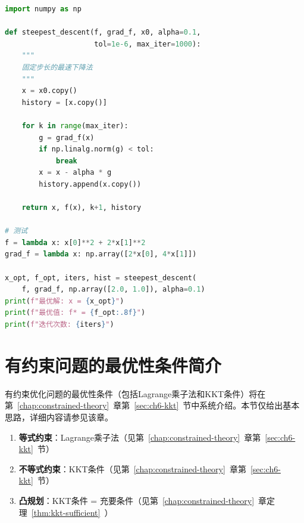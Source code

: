 \begin{lstlisting}[language=Python, caption=最速下降法实现]
import numpy as np

def steepest_descent(f, grad_f, x0, alpha=0.1, 
                     tol=1e-6, max_iter=1000):
    """
    固定步长的最速下降法
    """
    x = x0.copy()
    history = [x.copy()]
    
    for k in range(max_iter):
        g = grad_f(x)
        if np.linalg.norm(g) < tol:
            break
        x = x - alpha * g
        history.append(x.copy())
    
    return x, f(x), k+1, history

# 测试
f = lambda x: x[0]**2 + 2*x[1]**2
grad_f = lambda x: np.array([2*x[0], 4*x[1]])

x_opt, f_opt, iters, hist = steepest_descent(
    f, grad_f, np.array([2.0, 1.0]), alpha=0.1)
print(f"最优解: x = {x_opt}")
print(f"最优值: f* = {f_opt:.8f}")
print(f"迭代次数: {iters}")
\end{lstlisting}

\section{有约束问题的最优性条件简介}\label{sec:constrained-kkt}

有约束优化问题的最优性条件（包括Lagrange乘子法和KKT条件）将在第~\ref{chap:constrained-theory}~章第~\ref{sec:ch6-kkt}~节中系统介绍。本节仅给出基本思路，详细内容请参见该章。
\begin{conceptbox}[有约束问题的最优性条件概览]
\begin{enumerate}[label=\arabic*., leftmargin=2em]
    \item \textbf{等式约束}：Lagrange乘子法（见第~\ref{chap:constrained-theory}~章第~\ref{sec:ch6-kkt}~节）
    \item \textbf{不等式约束}：KKT条件（见第~\ref{chap:constrained-theory}~章第~\ref{sec:ch6-kkt}~节）
    \item \textbf{凸规划}：KKT条件 = 充要条件（见第~\ref{chap:constrained-theory}~章定理~\ref{thm:kkt-sufficient}~）\end{enumerate}
\end{conceptbox}

